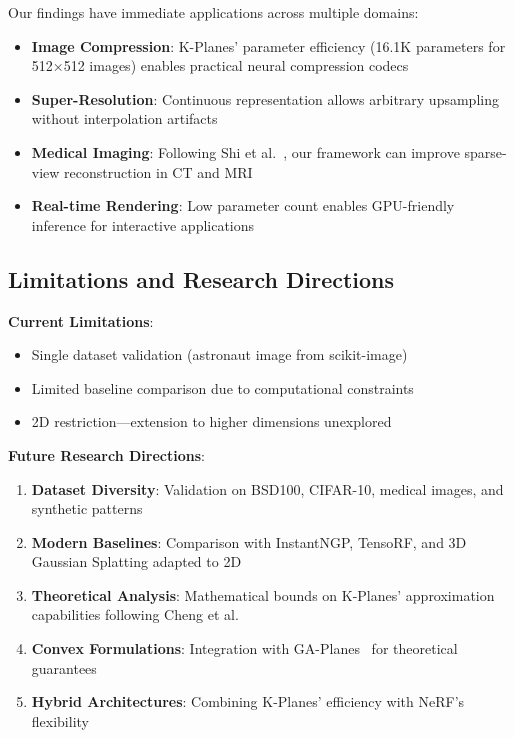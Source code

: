 \documentclass{article}
\begin{document}
Our findings have immediate applications across multiple domains:

\begin{itemize}
\item \textbf{Image Compression}: K-Planes' parameter efficiency (16.1K parameters for 512×512 images) enables practical neural compression codecs
\item \textbf{Super-Resolution}: Continuous representation allows arbitrary upsampling without interpolation artifacts
\item \textbf{Medical Imaging}: Following Shi et al.~\cite{shi2024inr}, our framework can improve sparse-view reconstruction in CT and MRI
\item \textbf{Real-time Rendering}: Low parameter count enables GPU-friendly inference for interactive applications
\end{itemize}

\subsection{Limitations and Research Directions}

\textbf{Current Limitations}:
\begin{itemize}
\item Single dataset validation (astronaut image from scikit-image)
\item Limited baseline comparison due to computational constraints  
\item 2D restriction—extension to higher dimensions unexplored
\end{itemize}

\textbf{Future Research Directions}:
\begin{enumerate}
\item \textbf{Dataset Diversity}: Validation on BSD100, CIFAR-10, medical images, and synthetic patterns
\item \textbf{Modern Baselines}: Comparison with InstantNGP, TensoRF, and 3D Gaussian Splatting adapted to 2D
\item \textbf{Theoretical Analysis}: Mathematical bounds on K-Planes' approximation capabilities following Cheng et al.~\cite{cheng2025lowrank}
\item \textbf{Convex Formulations}: Integration with GA-Planes~\cite{sivgin2024gaplanes} for theoretical guarantees
\item \textbf{Hybrid Architectures}: Combining K-Planes' efficiency with NeRF's flexibility
\end{enumerate}
\end{document}
